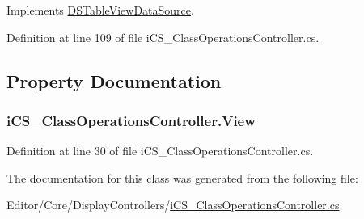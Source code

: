 Implements \hyperlink{interface_d_s_table_view_data_source_a7d1aee71e3dd3201fcb66a94b6a1511e}{D\+S\+Table\+View\+Data\+Source}.



Definition at line 109 of file i\+C\+S\+\_\+\+Class\+Operations\+Controller.\+cs.



\subsection{Property Documentation}
\hypertarget{classi_c_s___class_operations_controller_a97412a4cd5fbaee18b20e1cb5cb0237f}{
\subsubsection[{View}]{ i\+C\+S\+\_\+\+Class\+Operations\+Controller.\+View\hspace{0.3cm}{\ttfamily [get]}}}\label{classi_c_s___class_operations_controller_a97412a4cd5fbaee18b20e1cb5cb0237f}


Definition at line 30 of file i\+C\+S\+\_\+\+Class\+Operations\+Controller.\+cs.



The documentation for this class was generated from the following file\+:\begin{DoxyCompactItemize}
\item 
Editor/\+Core/\+Display\+Controllers/\hyperlink{i_c_s___class_operations_controller_8cs}{i\+C\+S\+\_\+\+Class\+Operations\+Controller.\+cs}\end{DoxyCompactItemize}
